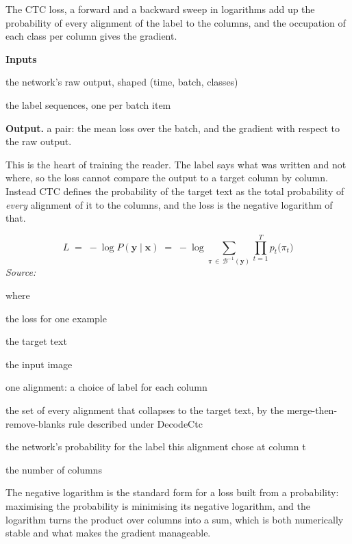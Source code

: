 The CTC loss, a forward and a backward sweep in logarithms add up the probability of every alignment of the label to the columns, and the occupation of each class per column gives the gradient.




\noindent\textbf{Inputs}
\begin{description}[leftmargin=2.2em,style=nextline,font=\normalfont\ttfamily]\setlength\itemsep{1pt}
  \item[{rawLogits}] \normalfont the network's raw output, shaped (time, batch, classes)
  \item[{targets}] \normalfont the label sequences, one per batch item
\end{description}

\noindent\textbf{Output.} a pair: the mean loss over the batch, and the gradient with respect to the raw output.


This is the heart of training the reader. The label says what was written and not where, so the loss cannot compare the output to a target column by column. Instead CTC \cite{graves2006} defines the probability of the target text as the total probability of \emph{every} alignment of it to the columns, and the loss is the negative logarithm of that.


\begin{equation}
L \;=\; -\log P(\mathbf{y} \mid \mathbf{x}) \;=\; -\log \!\!\sum_{\pi \,\in\, \mathcal{B}^{-1}(\mathbf{y})} \prod_{t=1}^{T} p_t\big(\pi_t\big)
\end{equation}
\noindent\emph{Source: }\cite{graves2006}


\noindent where
\begin{description}[leftmargin=2.4em,style=nextline,font=\normalfont\ttfamily]\setlength\itemsep{1pt}
  \item[{$L$}] \normalfont the loss for one example
  \item[{$\mathbf{y}$}] \normalfont the target text
  \item[{$\mathbf{x}$}] \normalfont the input image
  \item[{$\pi$}] \normalfont one alignment: a choice of label for each column
  \item[{$\mathcal{B}^{-1}(\mathbf{y})$}] \normalfont the set of every alignment that collapses to the target text, by the merge-then-remove-blanks rule described under DecodeCtc
  \item[{$p_t(\pi_t)$}] \normalfont the network's probability for the label this alignment chose at column t
  \item[{$T$}] \normalfont the number of columns
\end{description}
The negative logarithm is the standard form for a loss built from a probability: maximising the probability is minimising its negative logarithm, and the logarithm turns the product over columns into a sum, which is both numerically stable and what makes the gradient manageable.


